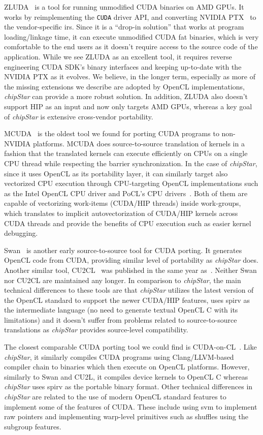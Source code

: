 \documentclass[Afour,sageh,times]{sagej}
\newcommand{\cuda}{\texttt{CUDA}\xspace}
\newcommand{\chipstar}{\textit{chipStar}\xspace}
\newcommand{\mycite}[1]{\citep{#1}}
\begin{document}
ZLUDA~\mycite{ZLUDA} is a tool for running unmodified CUDA binaries on AMD GPUs. 
It works by reimplementing the \cuda driver API, and converting NVIDIA PTX~\mycite{ptx} to the vendor-specific \gls{ir}s. Since it is a ``drop-in solution'' that works at program loading/linkage time, it can execute unmodified CUDA fat binaries, which is very comfortable to the end users as it doesn't require access to the source code of the application. While we see ZLUDA as an excellent tool, it requires reverse engineering CUDA SDK's binary interfaces and keeping up-to-date with the NVIDIA PTX as it evolves. We believe, in the longer term, especially as more of the missing extensions we describe are adopted by OpenCL implementations, \chipstar can provide a more robust solution. 
In addition, ZLUDA also doesn't support HIP as an input and now only targets AMD GPUs, whereas a key goal of \chipstar is extensive cross-vendor portability.

MCUDA~\mycite{MCUDA} is the oldest tool we found for porting CUDA programs to non-NVIDIA platforms. MCUDA does source-to-source translation of kernels in a fashion that the translated kernels can execute efficiently on CPUs on a single CPU thread while respecting the barrier synchronization. In the case of \chipstar, since it uses OpenCL as its portability layer, it can similarly target also vectorized CPU execution through CPU-targeting OpenCL implementations such as the Intel OpenCL CPU driver and PoCL's CPU drivers~\mycite{PoCL}. Both of them are capable of vectorizing work-items (CUDA/HIP threads) inside work-groups, which translates to implicit autovectorization of CUDA/HIP kernels across CUDA threads and provide the benefits of CPU execution such as easier kernel debugging.

Swan~\mycite{Swan} is another early source-to-source tool for CUDA porting. It generates OpenCL code from CUDA, providing similar level of portability as \chipstar does. Another similar tool, CU2CL~\mycite{CU2CL} was published in the same year as~\mycite{Swan}. Neither Swan nor CU2CL are maintained any longer.  In comparison to \chipstar, the main technical differences to these tools are that \chipstar utilizes the latest version of the OpenCL standard to support the newer CUDA/HIP features, uses \gls{spirv} as the intermediate language (no need to generate textual OpenCL C with its limitations) and it doesn't suffer from problems related to source-to-source translations as \chipstar provides source-level compatibility.

The closest comparable CUDA porting tool we could find is CUDA-on-CL~\mycite{CUDAonCL}. Like \chipstar, it similarly compiles CUDA programs using Clang/LLVM-based compiler chain to binaries which then execute on OpenCL platforms. However, similarly to Swan and CU2L, it compiles device kernels to OpenCL C whereas \chipstar uses \gls{spirv} as the portable binary format. Other technical differences in \chipstar are related to the use of modern OpenCL standard features to implement some of the features of CUDA. These include using \gls{svm} to implement raw pointers and implementing warp-level primitives such as shuffles using the subgroup features. 
\end{document}
